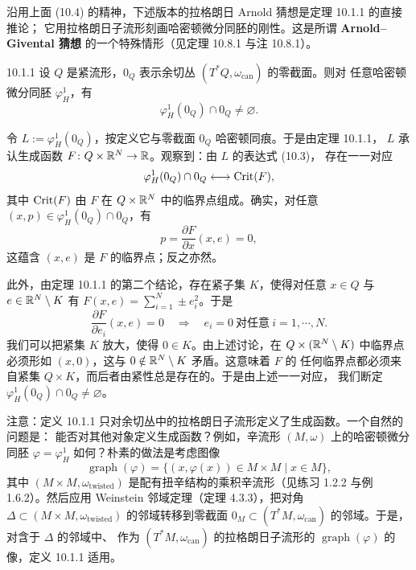 
沿用上面 (10.4) 的精神，下述版本的拉格朗日 Arnold 猜想是定理 10.1.1 的直接推论；
它用拉格朗日子流形刻画哈密顿微分同胚的刚性。这是所谓 \textbf{Arnold--Givental 猜想}
的一个特殊情形（见定理 10.8.1 与注 10.8.1）。

\begin{wcor}{10.1.1}
  设 $Q$ 是紧流形，$0_Q$ 表示余切丛 $(T^*Q,\omega_{\mathrm{can}})$ 的零截面。则对
  任意哈密顿微分同胚 $\varphi_H^1$，有
  \[
    \varphi_H^1(0_Q)\cap 0_Q\ne\varnothing.
  \]
\end{wcor}

\begin{wproof}
  令 $L:=\varphi_H^1(0_Q)$，按定义它与零截面 $0_Q$ 哈密顿同痕。于是由定理 10.1.1，
  $L$ 承认生成函数 $F\colon Q\times\mathbb{R}^N\to\mathbb{R}$。观察到：由 $L$ 的表达式 (10.3)，
  存在一一对应
  \[
    \varphi_H^1(0_Q)\cap 0_Q\longleftrightarrow\operatorname{Crit}(F),
  \]
  其中 $\operatorname{Crit}(F)$ 由 $F$ 在 $Q\times\mathbb{R}^N$ 中的临界点组成。确实，对任意
  $(x,p)\in\varphi_H^1(0_Q)\cap 0_Q$，有
  \[
    p=\frac{\partial F}{\partial x}(x,e)=0,
  \]
  这蕴含 $(x,e)$ 是 $F$ 的临界点；反之亦然。

  此外，由定理 10.1.1 的第二个结论，存在紧子集 $K$，使得对任意 $x\in Q$ 与
  $e\in\mathbb{R}^N\setminus K$ 有 $F(x,e)=\sum_{i=1}^N\pm e_i^2$。于是
  \[
    \frac{\partial F}{\partial e_i}(x,e)=0
    \quad\Longrightarrow\quad e_i=0
    \ \text{对任意}\ i=1,\cdots,N.
  \]
  我们可以把紧集 $K$ 放大，使得 $0\in K$。由上述讨论，在 $Q\times(\mathbb{R}^N\setminus K)$
  中临界点必须形如 $(x,0)$，这与 $0\notin\mathbb{R}^N\setminus K$ 矛盾。这意味着 $F$ 的
  任何临界点都必须来自紧集 $Q\times K$，而后者由紧性总是存在的。于是由上述一一对应，
  我们断定 $\varphi_H^1(0_Q)\cap 0_Q\ne\varnothing$。
\end{wproof}

注意：定义 10.1.1 只对余切丛中的拉格朗日子流形定义了生成函数。一个自然的问题是：
能否对其他对象定义生成函数？例如，辛流形 $(M,\omega)$ 上的哈密顿微分同胚
$\varphi=\varphi_H^1$ 如何？朴素的做法是考虑图像
\[
  \operatorname{graph}(\varphi)=\{(x,\varphi(x))\in M\times M\mid x\in M\},
\]
其中 $(M\times M,\omega_{\mathrm{twisted}})$ 是配有扭辛结构的乘积辛流形（见练习
1.2.2 与例 1.6.2）。然后应用 Weinstein 邻域定理（定理 4.3.3），把对角
$\Delta\subset(M\times M,\omega_{\mathrm{twisted}})$ 的邻域转移到零截面
$0_M\subset(T^*M,\omega_{\mathrm{can}})$ 的邻域。于是，对含于 $\Delta$ 的邻域中、
作为 $(T^*M,\omega_{\mathrm{can}})$ 的拉格朗日子流形的
$\operatorname{graph}(\varphi)$ 的像，定义 10.1.1 适用。

